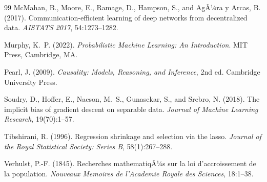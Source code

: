 ﻿\documentclass[12pt, a4paper]{article}
\theoremstyle{definition}
\theoremstyle{remark}
\begin{document}
\begin{thebibliography}{99}
McMahan, B., Moore, E., Ramage, D., Hampson, S., and AgÃ¼ra y Arcas, B. (2017).
\newblock Communication-efficient learning of deep networks from decentralized data.
\newblock \textit{AISTATS 2017}, 54:1273--1282.

Murphy, K.~P. (2022).
\newblock \textit{Probabilistic Machine Learning: An Introduction}.
\newblock MIT Press, Cambridge, MA.

Pearl, J. (2009).
\newblock \textit{Causality: Models, Reasoning, and Inference}, 2nd ed.
\newblock Cambridge University Press.

Soudry, D., Hoffer, E., Nacson, M.~S., Gunasekar, S., and Srebro, N. (2018).
\newblock The implicit bias of gradient descent on separable data.
\newblock \textit{Journal of Machine Learning Research}, 19(70):1--57.

Tibshirani, R. (1996).
\newblock Regression shrinkage and selection via the lasso.
\newblock \textit{Journal of the Royal Statistical Society: Series B}, 58(1):267--288.

Verhulst, P.-F. (1845).
\newblock Recherches mathematiqÃ¼s sur la loi d'accroissement de la population.
\newblock \textit{Nouveaux Memoires de l'Academie Royale des Sciences}, 18:1--38.

\end{thebibliography}
\end{document}
